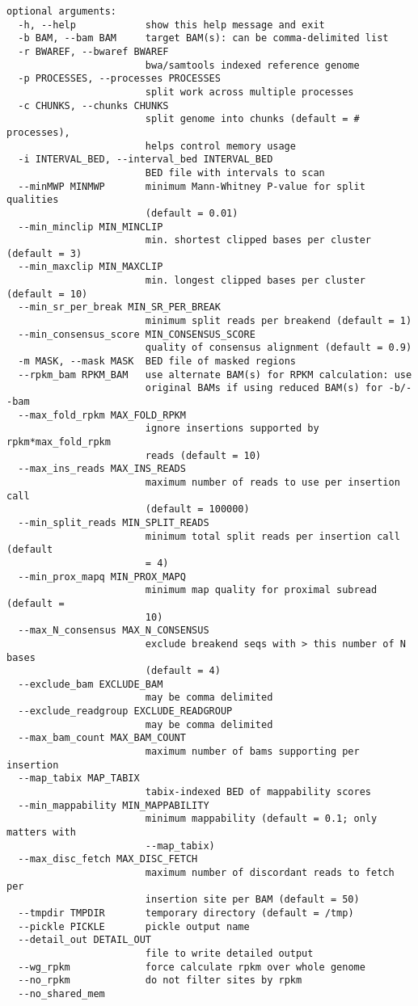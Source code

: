 \documentclass[letterpaper,11pt]{article}
\begin{document}
\begin{verbatim}
optional arguments:
  -h, --help            show this help message and exit
  -b BAM, --bam BAM     target BAM(s): can be comma-delimited list
  -r BWAREF, --bwaref BWAREF
                        bwa/samtools indexed reference genome
  -p PROCESSES, --processes PROCESSES
                        split work across multiple processes
  -c CHUNKS, --chunks CHUNKS
                        split genome into chunks (default = # processes),
                        helps control memory usage
  -i INTERVAL_BED, --interval_bed INTERVAL_BED
                        BED file with intervals to scan
  --minMWP MINMWP       minimum Mann-Whitney P-value for split qualities
                        (default = 0.01)
  --min_minclip MIN_MINCLIP
                        min. shortest clipped bases per cluster (default = 3)
  --min_maxclip MIN_MAXCLIP
                        min. longest clipped bases per cluster (default = 10)
  --min_sr_per_break MIN_SR_PER_BREAK
                        minimum split reads per breakend (default = 1)
  --min_consensus_score MIN_CONSENSUS_SCORE
                        quality of consensus alignment (default = 0.9)
  -m MASK, --mask MASK  BED file of masked regions
  --rpkm_bam RPKM_BAM   use alternate BAM(s) for RPKM calculation: use
                        original BAMs if using reduced BAM(s) for -b/--bam
  --max_fold_rpkm MAX_FOLD_RPKM
                        ignore insertions supported by rpkm*max_fold_rpkm
                        reads (default = 10)
  --max_ins_reads MAX_INS_READS
                        maximum number of reads to use per insertion call
                        (default = 100000)
  --min_split_reads MIN_SPLIT_READS
                        minimum total split reads per insertion call (default
                        = 4)
  --min_prox_mapq MIN_PROX_MAPQ
                        minimum map quality for proximal subread (default =
                        10)
  --max_N_consensus MAX_N_CONSENSUS
                        exclude breakend seqs with > this number of N bases
                        (default = 4)
  --exclude_bam EXCLUDE_BAM
                        may be comma delimited
  --exclude_readgroup EXCLUDE_READGROUP
                        may be comma delimited
  --max_bam_count MAX_BAM_COUNT
                        maximum number of bams supporting per insertion
  --map_tabix MAP_TABIX
                        tabix-indexed BED of mappability scores
  --min_mappability MIN_MAPPABILITY
                        minimum mappability (default = 0.1; only matters with
                        --map_tabix)
  --max_disc_fetch MAX_DISC_FETCH
                        maximum number of discordant reads to fetch per
                        insertion site per BAM (default = 50)
  --tmpdir TMPDIR       temporary directory (default = /tmp)
  --pickle PICKLE       pickle output name
  --detail_out DETAIL_OUT
                        file to write detailed output
  --wg_rpkm             force calculate rpkm over whole genome
  --no_rpkm             do not filter sites by rpkm
  --no_shared_mem

\end{verbatim}
\end{document}
